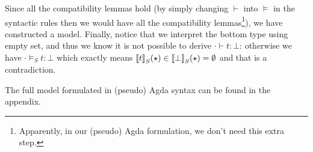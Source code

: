Since all the compatibility lemmas hold (by simply changing $\vdash$ into $\models$ in the syntactic rules then we would have all the compatibility lemmas\footnote{Apparently, in our (pseudo) Agda formulation, we don't need this extra step.}), we have constructed a model.
Finally, notice that we interpret the bottom type using empty set, and thus we know it is not possible to derive $\cdot \vdash t : \bot$: otherwise we have $\cdot \models_S t : \bot$ which exactly means ${\llbracket {t} \rrbracket}_S(\star) \in {\llbracket {\bot} \rrbracket}_S(\star) = \emptyset$ 
and that is a contradiction.

The full model formulated in (pseudo) Agda syntax can be found in the appendix.

